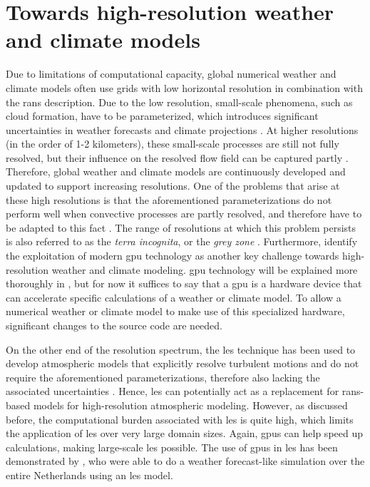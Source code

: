 \section{Towards high-resolution weather and climate models}
Due to limitations of computational capacity, global numerical weather and climate models often use grids with low horizontal resolution in combination with the \acrshort{rans} description. Due to the low resolution, small-scale phenomena, such as cloud formation, have to be parameterized, which introduces significant uncertainties in weather forecasts and climate projections \citep{slingoUncertaintyWeatherClimate2011}. At higher resolutions (in the order of 1-2 kilometers), these small-scale processes are still not fully resolved, but their influence on the resolved flow field can be captured partly \citep{scharKilometerScaleClimateModels2020}. Therefore, global weather and climate models are continuously developed and updated to support increasing resolutions. One of the problems that arise at these high resolutions is that the aforementioned parameterizations do not perform well when convective processes are partly resolved, and therefore have to be adapted to this fact \citep{wyngaardNumericalModelingTerra2004}. The range of resolutions at which this problem persists is also referred to as the \emph{terra incognita}, or the \emph{grey zone} \citep{schalkwijkWeatherForecastingUsing2015,wyngaardNumericalModelingTerra2004}. Furthermore, \citet{scharKilometerScaleClimateModels2020} identify the exploitation of modern \acrlong{gpu} technology as another key challenge towards high-resolution weather and climate modeling. \acrshort{gpu} technology will be explained more thoroughly in , but for now it suffices to say that a \acrshort{gpu} is a hardware device that can accelerate specific calculations of a weather or climate model. To allow a numerical weather or climate model to make use of this specialized hardware, significant changes to the source code are needed.

On the other end of the resolution spectrum, the \acrshort{les} technique has been used to develop atmospheric models that explicitly resolve turbulent motions and do not require the aforementioned parameterizations, therefore also lacking the associated uncertainties \citep{schalkwijkWeatherForecastingUsing2015}. Hence, \acrshort{les} can potentially act as a replacement for \acrshort{rans}-based models for high-resolution atmospheric modeling. However, as discussed before, the computational burden associated with \acrshort{les} is quite high, which limits the application of \acrshort{les} over very large domain sizes. Again, \acrshort{gpu}s can help speed up calculations, making large-scale \acrshort{les} possible. The use of \acrshort{gpu}s in \acrshort{les} has been demonstrated by \citet{schalkwijkWeatherForecastingUsing2015}, who were able to do a weather forecast-like simulation over the entire Netherlands using an \acrshort{les} model.

